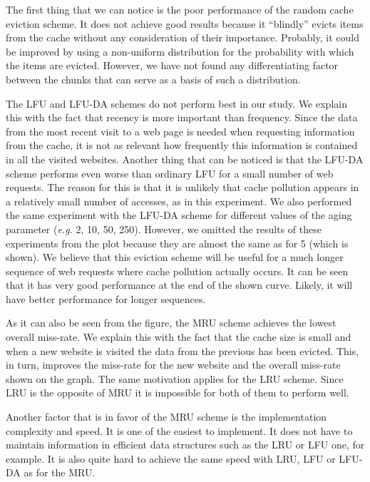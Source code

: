 The first thing that we can notice is the poor performance of the random cache eviction scheme. It does not achieve 
good results because it ``blindly'' evicts items from the cache without any consideration of their importance. Probably,
it could be improved by using a non-uniform distribution for the probability with which the items are evicted. However,
we have not found any differentiating factor between the chunks that can serve as a basis of such a distribution.

The LFU and LFU-DA schemes do not perform best in our study. We explain this with the fact that recency is more important
than frequency. Since the data from the most recent visit to a web page is needed when requesting information from the 
cache, it is not as relevant how frequently this information is contained in all the visited websites. Another thing that can be
noticed is that the LFU-DA scheme performs even worse than ordinary LFU for a small number of web requests. The reason for this is that it is unlikely that
cache pollution appears in a relatively small number of accesses, as in this experiment. We also performed the same experiment with the LFU-DA scheme for different values of the aging parameter (\textit{e.g.} 2, 10, 50, 250). However, we omitted the results of these experiments from the plot because they are almost the same as for 5 (which is shown). We 
believe that this eviction scheme will be useful for a much longer sequence of web requests where cache pollution actually occurs. It can be seen that it has very good performance at the end of the shown curve. Likely, it will have better performance for longer sequences.

As it can also be seen from the figure, the MRU scheme achieves the lowest overall miss-rate. We explain this with the fact that
the cache size is small and when a new website is visited the data from the previous has been evicted. This, in turn, improves the miss-rate for the new website and the overall miss-rate shown on the graph. The same motivation applies for the 
LRU scheme. Since LRU is the opposite of MRU it is impossible for both of them to perform well. 

Another factor that is in favor of the MRU scheme is the implementation complexity and speed. It is one of the easiest to
implement. It does not have to maintain information in efficient data structures such as the LRU or LFU one, for example. 
It is also quite hard to achieve the same speed with LRU, LFU or LFU-DA as for the MRU.

